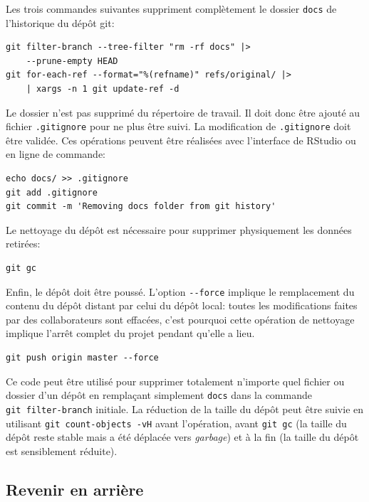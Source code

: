 \documentclass[
  12pt,
  french,
  a4paper,
  extrafontsizes,onecolumn,openright
  ]{memoir}
\newlength{\rf}
\begin{document}
Les trois commandes suivantes suppriment complètement le dossier \texttt{docs} de l'historique du dépôt git:

\begin{verbatim}
git filter-branch --tree-filter "rm -rf docs" |>
    --prune-empty HEAD
git for-each-ref --format="%(refname)" refs/original/ |>
    | xargs -n 1 git update-ref -d
\end{verbatim}

Le dossier n'est pas supprimé du répertoire de travail.
Il doit donc être ajouté au fichier \texttt{.gitignore} pour ne plus être suivi.
La modification de \texttt{.gitignore} doit être validée.
Ces opérations peuvent être réalisées avec l'interface de RStudio ou en ligne de commande:

\begin{verbatim}
echo docs/ >> .gitignore
git add .gitignore
git commit -m 'Removing docs folder from git history'
\end{verbatim}

Le nettoyage du dépôt est nécessaire pour supprimer physiquement les données retirées:

\begin{verbatim}
git gc
\end{verbatim}

Enfin, le dépôt doit être poussé.
L'option \texttt{-\/-force} implique le remplacement du contenu du dépôt distant par celui du dépôt local: toutes les modifications faites par des collaborateurs sont effacées, c'est pourquoi cette opération de nettoyage implique l'arrêt complet du projet pendant qu'elle a lieu.

\begin{verbatim}
git push origin master --force
\end{verbatim}

Ce code peut être utilisé pour supprimer totalement n'importe quel fichier ou dossier d'un dépôt en remplaçant simplement \texttt{docs} dans la commande \texttt{git\ filter-branch} initiale.
La réduction de la taille du dépôt peut être suivie en utilisant \texttt{git\ count-objects\ -vH} avant l'opération, avant \texttt{git\ gc} (la taille du dépôt reste stable mais a été déplacée vers \emph{garbage}) et à la fin (la taille du dépôt est sensiblement réduite).

\hypertarget{revenir-en-arriuxe8re-1}{%
\subsection{Revenir en arrière}\label{revenir-en-arriuxe8re-1}}
\end{document}
